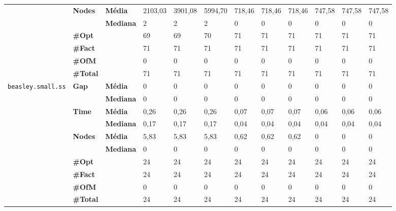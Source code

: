 \documentclass[]{article}
\begin{document}
\begin{table}[]
\begin{adjustbox}{angle=90}
\begin{tabular}{cll|lll|lll|lll}
\cline{2-12}
& \multirow{2}{*}{\textbf{Nodes}} & \textbf{Média} & 2103,03 & 3901,08 & 5994,70 & 718,46 & 718,46 & 718,46 & 747,58 & 747,58 & 747,58 \\
& & \textbf{Mediana} & 2 & 2 & 2 & 0 & 0 & 0 & 0 & 0 & 0 \\
\cline{2-12}
& \textbf{\#Opt} & & 69 & 69 & 70 & 71 & 71 & 71 & 71 & 71 & 71 \\
& \textbf{\#Fact} & & 71 & 71 & 71 & 71 & 71 & 71 & 71 & 71 & 71 \\
& \textbf{\#OfM} & & 0 & 0 & 0 & 0 & 0 & 0 & 0 & 0 & 0 \\
& \textbf{\#Total} & & 71 & 71 & 71 & 71 & 71 & 71 & 71 & 71 & 71 \\
\hline
\multirow{7}{*}{\texttt{beasley.small.ss}} & \multirow{2}{*}{\textbf{Gap}} & \textbf{Média} & 0 & 0 & 0 & 0 & 0 & 0 & 0 & 0 & 0 \\
& & \textbf{Mediana} & 0 & 0 & 0 & 0 & 0 & 0 & 0 & 0 & 0 \\
\cline{2-12}
& \multirow{2}{*}{\textbf{Time}} & \textbf{Média} & 0,26 & 0,26 & 0,26 & 0,07 & 0,07 & 0,07 & 0,06 & 0,06 & 0,06 \\
& & \textbf{Mediana} & 0,17 & 0,17 & 0,17 & 0,04 & 0,04 & 0,04 & 0,04 & 0,04 & 0,04 \\
\cline{2-12}
& \multirow{2}{*}{\textbf{Nodes}} & \textbf{Média} & 5,83 & 5,83 & 5,83 & 0,62 & 0,62 & 0,62 & 0 & 0 & 0 \\
& & \textbf{Mediana} & 0 & 0 & 0 & 0 & 0 & 0 & 0 & 0 & 0 \\
\cline{2-12}
& \textbf{\#Opt} & & 24 & 24 & 24 & 24 & 24 & 24 & 24 & 24 & 24 \\
& \textbf{\#Fact} & & 24 & 24 & 24 & 24 & 24 & 24 & 24 & 24 & 24 \\
& \textbf{\#OfM} & & 0 & 0 & 0 & 0 & 0 & 0 & 0 & 0 & 0 \\
& \textbf{\#Total} & & 24 & 24 & 24 & 24 & 24 & 24 & 24 & 24 & 24 \\
\end{tabular}
\end{adjustbox}
\end{table}
\end{document}
